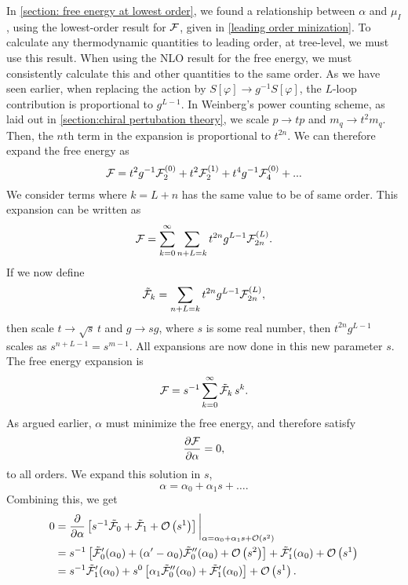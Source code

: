 In \autoref{section: free energy at lowest order}, we found a relationship between $\alpha$ and $\mu_I$, using the lowest-order result for $\mathcal{F}$, given in \cref{leading order minization}.
To calculate any thermodynamic quantities to leading order, at tree-level, we must use this result.
When using the NLO result for the free energy, we must consistently calculate this and other quantities to the same order.
As we have seen earlier, when replacing the action by $S[\varphi] \rightarrow g^{-1}S[\varphi]$, the $L$-loop contribution is proportional to $g^{L-1}$.
In Weinberg's power counting scheme, as laid out in \autoref{section:chiral pertubation theory}, we scale $p \rightarrow t p$ and $m_q \rightarrow t^2 m_q$.
Then, the $n$th term in the expansion is proportional to $t^{2n}$.
We can therefore expand the free energy as
\begin{equation}
    \mathcal{F} = t^2 g^{-1} \mathcal{F}_2^{(0)} + t^2 \mathcal{F}_2^{(1)} + t^4 g^{-1} \mathcal{F}_4^{(0)}
    + ...
\end{equation}
%
We consider terms where $k = L + n$ has the same value to be of same order.
This expansion can be written as
\begin{equation}
    \mathcal{F} = \sum_{k=0}^\infty \sum_{n+L=k} t^{2n} g^{L-1} \mathcal{F}_{2n}^{(L)}.
\end{equation}
%
If we now define
\begin{equation}
    \tilde {\mathcal{F}}_k = \sum_{n+L=k} t^{2n} g^{L-1} \mathcal{F}_{2n}^{(L)},
\end{equation}
%
then scale $t \rightarrow \sqrt{s} \, t$ and $g \rightarrow s g$, where $s$ is some real number, then $t^{2n}g^{L-1}$ scales as $s^{n+L-1} = s^{m-1}$.
All expansions are now done in this new parameter $s$.
The free energy expansion is
\begin{equation}
    \mathcal{F} = s^{-1}\sum_{k = 0}^\infty \tilde {\mathcal{F}}_k \, s^{k}.
\end{equation}
%
As argued earlier, $\alpha$ must minimize the free energy, and therefore satisfy
\begin{equation}
    \diffp{\Ef}{\alpha} = 0,
\end{equation}
%
to all orders.
We expand this solution in $s$,
\begin{equation}
    \alpha = \alpha_0 + \alpha_1 s + \dots.
\end{equation}
%
Combining this, we get
\begin{align}
    \nonumber
    0 &
    = 
    \diffp{}{\alpha}
    \left[
        s^{-1}\tilde \Ef_0
        + 
        \tilde \Ef_1
        +
        \Oh[1]{s}
    \right]
    \bigg|_{\alpha=\alpha_0 + \alpha_1 s + \Oh{s}} 
    \\ \nonumber
    & = 
    s^{-1 }
    \left[
        \tilde \Ef_0'(\alpha_0)
        +
        (\alpha' - \alpha_0)
        \tilde \Ef_0''(\alpha_0)
        +
        \Oh[2]{s}
    \right]
    +
    \tilde\Ef_1'(\alpha_0)
    +
    \Oh[1]{s} \\
    &
    =
    s^{-1} \tilde\Ef_1'(\alpha_0)
    + s^{0}
    \left[
        \alpha_1
        \tilde \Ef_0''(\alpha_0)
        +
    \tilde\Ef_1'(\alpha_0)
    \right]
    +
    \Oh[1]{s}.
    \label{minimizing free energy expansion}
\end{align}
